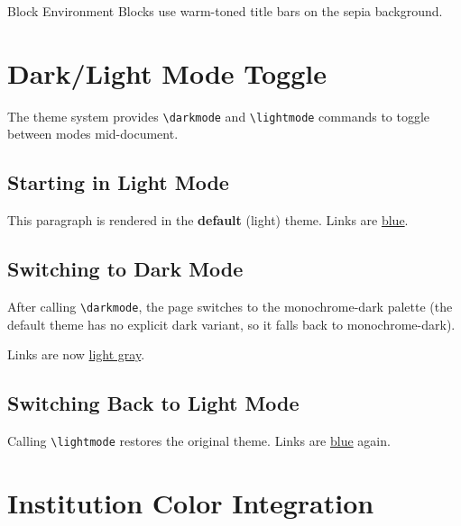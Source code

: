 \documentclass[
    language=english,
    doctype=article,
    institution=none,
    titlestyle=simple,
]{../../omnilatex}
\begin{document}
\begin{block}{Block Environment}
    Blocks use warm-toned title bars on the sepia background.
\end{block}

\newpage


\section{Dark/Light Mode Toggle}

The theme system provides \texttt{\textbackslash darkmode} and
\texttt{\textbackslash lightmode} commands to toggle between modes
mid-document.

\subsection{Starting in Light Mode}


This paragraph is rendered in the \textbf{default} (light) theme.
Links are \href{https://github.com/WyattAu/OmniLaTeX-template}{blue}.

\subsection{Switching to Dark Mode}

\darkmode

After calling \texttt{\textbackslash darkmode}, the page switches to the
monochrome-dark palette (the default theme has no explicit dark variant,
so it falls back to monochrome-dark).

Links are now \href{https://github.com/WyattAu/OmniLaTeX-template}{light gray}.

\subsection{Switching Back to Light Mode}

\lightmode

Calling \texttt{\textbackslash lightmode} restores the original theme.
Links are \href{https://github.com/WyattAu/OmniLaTeX-template}{blue} again.

\newpage


\section{Institution Color Integration}
\end{document}
